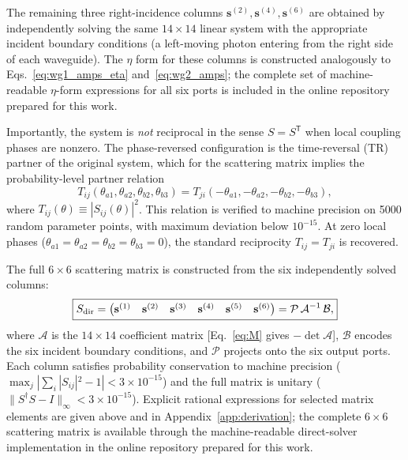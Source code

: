 \documentclass[aps,pra,reprint,superscriptaddress,nofootinbib,longbibliography,floatfix]{revtex4-2}
\begin{document}
The remaining three right-incidence columns $\mathbf{s}^{(2)},\mathbf{s}^{(4)},\mathbf{s}^{(6)}$ are obtained by independently solving the same $14\times14$ linear system with the appropriate incident boundary conditions (a left-moving photon entering from the right side of each waveguide). The $\eta$ form for these columns is constructed analogously to Eqs.~\eqref{eq:wg1_amps_eta} and~\eqref{eq:wg2_amps}; the complete set of machine-readable $\eta$-form expressions for all six ports is included in the online repository prepared for this work.

Importantly, the system is \emph{not} reciprocal in the sense $S=S^{\mathsf T}$ when local coupling phases are nonzero. The phase-reversed configuration is the time-reversal (TR) partner of the original system, which for the scattering matrix implies the probability-level partner relation
\begin{equation}
  T_{ij}(\theta_{a1},\theta_{a2},\theta_{b2},\theta_{b3})
  = T_{ji}(-\theta_{a1},-\theta_{a2},-\theta_{b2},-\theta_{b3}),
  \label{eq:tr_partner}
\end{equation}
where $T_{ij}(\theta)\equiv|S_{ij}(\theta)|^2$.
This relation is verified to machine precision on 5000 random parameter points, with maximum deviation below $10^{-15}$.
At zero local phases ($\theta_{a1}=\theta_{a2}=\theta_{b2}=\theta_{b3}=0$), the standard reciprocity $T_{ij}=T_{ji}$ is recovered.

The full $6\times6$ scattering matrix is constructed from the six independently solved columns:
\begin{equation}
\boxed{
  S_{\rm dir} = 
  \begin{pmatrix}
  \mathbf{s}^{(1)} & \mathbf{s}^{(2)} & \mathbf{s}^{(3)} & \mathbf{s}^{(4)} & \mathbf{s}^{(5)} & \mathbf{s}^{(6)}
  \end{pmatrix}
  = \mathcal{P}\,\mathcal{A}^{-1}\,\mathcal{B},
}
\label{eq:Sfull}
\end{equation}
where $\mathcal{A}$ is the $14\times14$ coefficient matrix [Eq.~\eqref{eq:M} gives $-\det\mathcal{A}$], $\mathcal{B}$ encodes the six incident boundary conditions, and $\mathcal{P}$ projects onto the six output ports. Each column satisfies probability conservation to machine precision ($\max_j|\sum_i|S_{ij}|^2-1|<3\times10^{-15}$) and the full matrix is unitary ($\|S^\dagger S-I\|_\infty<3\times10^{-15}$).
Explicit rational expressions for selected matrix elements are given above and in Appendix~\ref{app:derivation}; the complete $6\times6$ scattering matrix is available through the machine-readable direct-solver implementation in the online repository prepared for this work.
\end{document}
